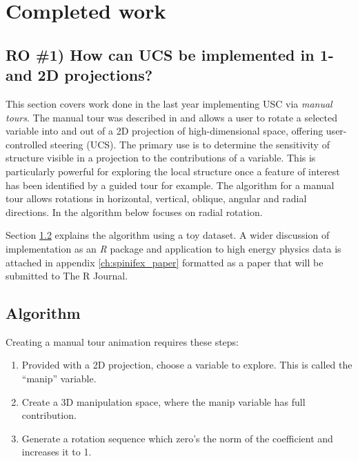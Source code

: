 \documentclass{monashthesis}
\begin{document}
\chapter{Completed work}\label{ch:completed_work}

\section{RO \#1) How can UCS be implemented in 1- and 2D
projections?}\label{ro-1-how-can-ucs-be-implemented-in-1--and-2d-projections}

This section covers work done in the last year implementing USC via
\emph{manual tours}. The manual tour was described in
\textcite{cook_manual_1997} and allows a user to rotate a selected
variable into and out of a 2D projection of high-dimensional space,
offering user-controlled steering (UCS). The primary use is to determine
the sensitivity of structure visible in a projection to the
contributions of a variable. This is particularly powerful for exploring
the local structure once a feature of interest has been identified by a
guided tour \autocite{cook_grand_1995} for example. The algorithm for a
manual tour allows rotations in horizontal, vertical, oblique, angular
and radial directions. In the algorithm below focuses on radial
rotation.

Section \ref{sec:algorithm} explains the algorithm using a toy dataset.
A wider discussion of implementation as an \emph{R} package and
application to high energy physics data is attached in appendix
\ref{ch:spinifex_paper} formatted as a paper that will be submitted to
The R Journal.

\section{Algorithm}\label{sec:algorithm}

Creating a manual tour animation requires these steps:

\begin{enumerate}
\def\labelenumi{\arabic{enumi}.}
\tightlist
\item
  Provided with a 2D projection, choose a variable to explore. This is
  called the ``manip'' variable.
\item
  Create a 3D manipulation space, where the manip variable has full
  contribution.
\item
  Generate a rotation sequence which zero's the norm of the coefficient
  and increases it to 1.
\end{enumerate}
\end{document}
